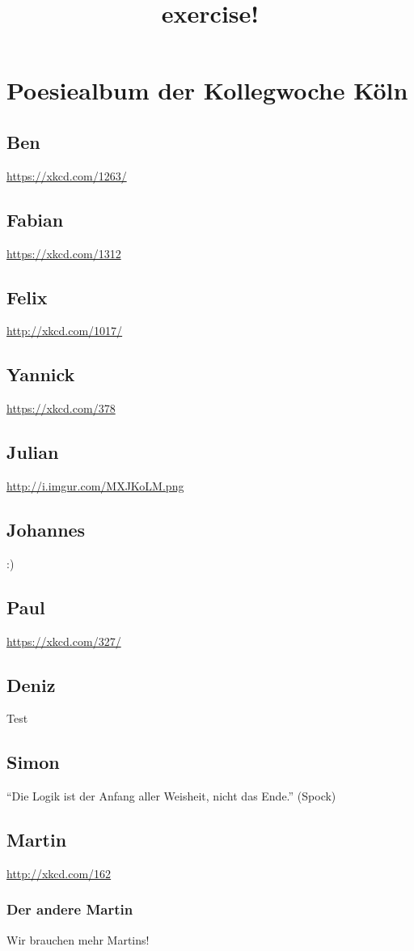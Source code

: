 \documentclass[12pt]{scrartcl}
\begin{document}
\title{exercise!}
\maketitle
\section{Poesiealbum der Kollegwoche Köln}
\subsection{Ben}
\url{https://xkcd.com/1263/}
\subsection{Fabian}
\url{https://xkcd.com/1312}
\subsection{Felix}
\url{http://xkcd.com/1017/}
\subsection{Yannick}
\url{https://xkcd.com/378}
\subsection{Julian}
\url{http://i.imgur.com/MXJKoLM.png}
\subsection{Johannes}
:)
\subsection{Paul}
\url{https://xkcd.com/327/}

\subsection{Deniz}
Test

\subsection{Simon}
``Die Logik ist der Anfang aller Weisheit, nicht das Ende.'' (Spock)
\subsection{Martin}
\url{http://xkcd.com/162}
\subsubsection{Der andere Martin}
Wir brauchen mehr Martins!
\end{document}
